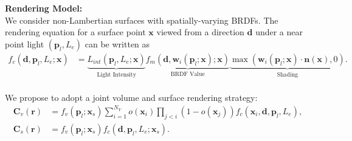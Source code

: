 \documentclass[landscape,a0paper,fontscale=0.292]{baposter}
\newcommand{\viewdir}{\boldsymbol{d}}
\newcommand{\lightloc}{\boldsymbol{p}_l}
\newcommand{\lightint}{L_e}
\newcommand{\ray}{\boldsymbol{r}}
\newcommand{\pixelcolor}{\boldsymbol{C}}
\newcommand{\point}{\boldsymbol{x}}
\newcommand{\lin}{L_{int}}
\newcommand{\din}{\boldsymbol{w}_i}
\newcommand{\normal}{\boldsymbol{n}}
\newcommand{\brdf}{f_m}
\begin{document}
\begin{poster}
{    \vspace{0.5em}
    \textbf{\color{ctitle}Rendering Model:}  \\[0.2em]
    We consider non-Lambertian surfaces with spatially-varying BRDFs. The rendering equation for a surface point $\point$ viewed from a direction $\viewdir$ under a near point light $(\lightloc, \lightint)$ can be written as
    \vspace{-0.5em}
    {\small
    \begin{align*}
        f_c(\viewdir, \lightloc, \lightint ; \point) 
        &= \underbrace{\lin(\lightloc, \lightint; \point)}_{\text{Light Intensity}} \underbrace{\brdf (\viewdir, \din(\lightloc;\point); \point)}_{\text{BRDF Value}} \underbrace{\max\left(\din(\lightloc;\point) \cdot \normal(\point), 0 \right)}_{\text{Shading}}.
    \end{align*}
    }
    \vspace{-1em}\\
    We propose to adopt a joint volume and surface rendering strategy:
    \vspace{-0.8em}
    {\small
    \begin{align*}
        \pixelcolor_v(\ray)&= f_v(\lightloc; \point_{s}) \sum_{i=1}^{N_V} o(\point_{i}) \prod_{j<i}\left(1-o\left(\point_{j}\right)\right)  f_c(\point_{i}, \viewdir, \lightloc, \lightint ), \\
        \pixelcolor_s(\ray) &= f_v(\lightloc; \point_{s})f_c( \viewdir, \lightloc, \lightint ;\point_{s}).
    \end{align*}
    }
    \vspace{-1.2em}
    
}
\end{poster}
\end{document}
